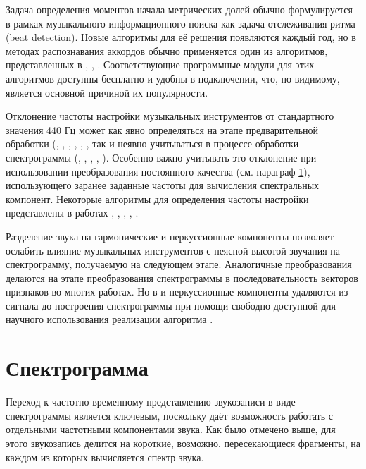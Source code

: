 Задача определения моментов начала метрических долей обычно формулируется в
рамках музыкального информационного поиска как задача отслеживания ритма (beat
detection). Новые алгоритмы для её решения появляются каждый год, но в методах
распознавания аккордов обычно применяется один из алгоритмов, представленных в
\cite{Davies2007}, \cite{Dixon2007}, \cite{Ellis2007}. Соответствующие
программные модули для этих алгоритмов доступны бесплатно и удобны в
подключении, что, по-видимому, является основной причиной их популярности.

Отклонение частоты настройки музыкальных инструментов от стандартного значения
440 Гц может как явно определяться на этапе предварительной обработки
(\cite{Gomez2006}, \cite{Papadopoulos2007}, \cite{Khadkevich2009},
\cite{Khadkevich2011}, \cite{Ni2011}, \cite{Jiang2011}, так и неявно учитываться
в процессе обработки спектрограммы (\cite{Bello2005}, \cite{Lee2006},
\cite{Reed2009}, \cite{Mauch2010}, \cite{Rocher2010}). Особенно важно учитывать
это отклонение при использовании преобразования постоянного качества (см.
параграф \ref{sectL_spect}), использующего заранее заданные частоты для
вычисления спектральных компонент. Некоторые алгоритмы для определения частоты
настройки представлены в работах \cite{Harte2005}, \cite{Zhu2005},
\cite{Gomez2006}, \cite{Peeters2006}, \cite{KhadkevichPhase2009}.

Разделение звука на гармонические и перкуссионные компоненты позволяет ослабить
влияние музыкальных инструментов с неясной высотой звучания на спектрограмму,
получаемую на следующем этапе. Аналогичные преобразования делаются на этапе
преобразования спектрограммы в последовательность векторов признаков во многих
работах. Но в \cite{Reed2009} и \cite{Ni2011} перкуссионные компоненты удаляются
из сигнала до построения спектрограммы при помощи свободно доступной для
научного использования реализации алгоритма \cite{Ono2008}.

\section{Спектрограмма} \label{sectL_spect}

Переход к частотно-временному представлению звукозаписи в виде спектрограммы
является ключевым, поскольку даёт возможность работать с отдельными частотными
компонентами звука. Как было отмечено выше, для этого звукозапись делится на
короткие, возможно, пересекающиеся фрагменты, на каждом из которых вычисляется
спектр звука.

